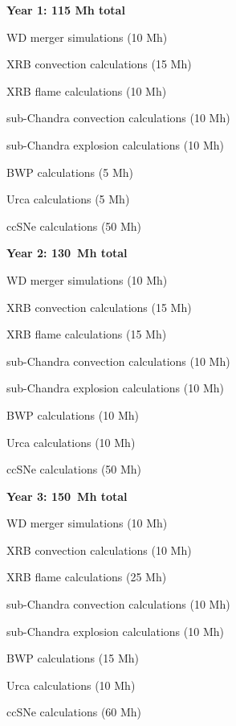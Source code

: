 \begin{tightitem}
\item {\bf Year 1: 115 Mh total }
%
\begin{tightitem}
\item WD merger simulations (10 Mh)
\item XRB convection calculations (15 Mh)
\item XRB flame calculations (10 Mh)
\item sub-Chandra convection calculations (10 Mh)
\item sub-Chandra explosion calculations (10 Mh)
\item BWP calculations (5 Mh)
\item Urca calculations (5 Mh)
\item ccSNe calculations (50 Mh)
\end{tightitem}
%
\item {\bf Year 2: 130~Mh total}
%
\begin{tightitem}
\item WD merger simulations (10 Mh)
\item XRB convection calculations (15 Mh)
\item XRB flame calculations (15 Mh)
\item sub-Chandra convection calculations (10 Mh)
\item sub-Chandra explosion calculations (10 Mh)
\item BWP calculations (10 Mh)
\item Urca calculations (10 Mh)
\item ccSNe calculations (50 Mh)
\end{tightitem}
%
\item {\bf Year 3: 150~Mh total}
%
\begin{tightitem}
\item WD merger simulations (10 Mh)
\item XRB convection calculations (10 Mh)
\item XRB flame calculations (25 Mh)
\item sub-Chandra convection calculations (10 Mh)
\item sub-Chandra explosion calculations (10 Mh)
\item BWP calculations (15 Mh)
\item Urca calculations (10 Mh)
\item ccSNe calculations (60 Mh)
\end{tightitem}
%
\end{tightitem}

